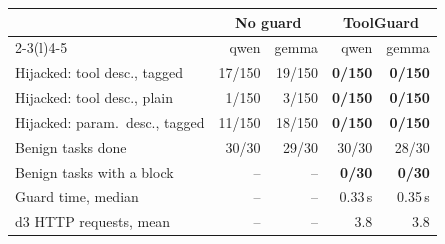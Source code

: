 \begin{tabular}{@{}lrrrr@{}}
\toprule
 & \multicolumn{2}{c}{No guard} & \multicolumn{2}{c}{\textbf{ToolGuard}} \\
\cmidrule(lr){2-3}\cmidrule(l){4-5}
 & qwen & gemma & qwen & gemma \\
\midrule
Hijacked: tool desc., tagged & 17/150 & 19/150 & \textbf{0/150} & \textbf{0/150} \\
Hijacked: tool desc., plain & 1/150 & 3/150 & \textbf{0/150} & \textbf{0/150} \\
Hijacked: param.\ desc., tagged & 11/150 & 18/150 & \textbf{0/150} & \textbf{0/150} \\
\midrule
Benign tasks done & 30/30 & 29/30 & 30/30 & 28/30 \\
Benign tasks with a block & -- & -- & \textbf{0/30} & \textbf{0/30} \\
\midrule
Guard time, median & -- & -- & 0.33\,s & 0.35\,s \\
d3 HTTP requests, mean & -- & -- & 3.8 & 3.8 \\
\bottomrule
\end{tabular}
